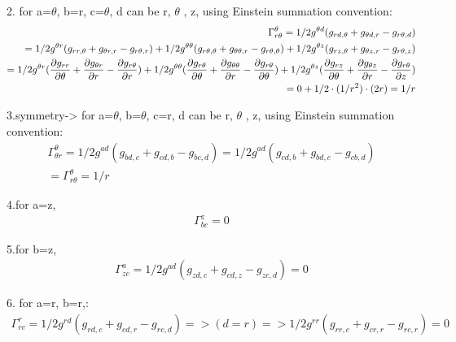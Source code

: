 \documentclass{Note}
\begin{document}
2. for a=$\theta$, b=r, c=$\theta$, d can be r, $\theta$ , z, using Einstein summation convention:
\begin{equation}
\begin{aligned}
\Gamma_{r \theta}^\theta=1/2 g^{\theta d}(g_{r d,\theta}+g_{\theta d,r}-g_{r\theta,d})\\
=1/2 g^{\theta r}(g_{r r,\theta}+g_{\theta r,r}-g_{r \theta,r})+1/2 g^{\theta \theta}(g_{r \theta,\theta}+g_{\theta \theta,r}-g_{r \theta,\theta})+1/2 g^{\theta z}(g_{r z,\theta}+g_{\theta z,r}-g_{r \theta,z})\\
=1/2 g^{\theta r}({\partial g_{r r}\over\partial \theta}+{\partial g_{\theta r}\over\partial r}-{\partial g_{r \theta}\over\partial r})+1/2 g^{\theta \theta}({\partial g_{r \theta}\over\partial \theta}+{\partial g_{\theta \theta}\over\partial r}-{\partial g_{r \theta}\over\partial \theta})+1/2 g^{\theta z}({\partial g_{r z}\over\partial \theta}+{\partial g_{\theta z}\over\partial r}-{\partial g_{r \theta}\over\partial z})\\
=0+1/2\cdot (1/r^2)\cdot (2r)=1/r
\end{aligned}
\end{equation}

3.symmetry-> for a=$\theta$, b=$\theta$, c=r, d can be r, $\theta$ , z, using Einstein summation convention:
\begin{equation}
\begin{aligned}
\Gamma_{\theta r }^\theta=1/2 g^{ad}(g_{bd,c}+g_{cd,b}-g_{bc,d})=1/2 g^{ad}(g_{cd,b}+g_{bd,c}-g_{cb,d})\\=
\Gamma_{r \theta}^\theta=1/r
\end{aligned}
\end{equation}

4.for a=z, 
\begin{equation}
\begin{aligned}
\Gamma_{b c }^z=0
\end{aligned}
\end{equation}

5.for b=z, 
\begin{equation}
\begin{aligned}
\Gamma_{z c }^a=1/2 g^{ad}(g_{z d,c}+g_{cd,z}-g_{zc,d})=0
\end{aligned}
\end{equation}

6. for a=r, b=r,:
\begin{equation}
\begin{aligned}
\Gamma_{rc}^r=1/2 g^{rd}(g_{rd,c}+g_{cd,r}-g_{rc,d})=>(d=r)=>1/2 g^{rr}(g_{rr,c}+g_{cr,r}-g_{rc,r})=0
\end{aligned}
\end{equation}
\end{document}

